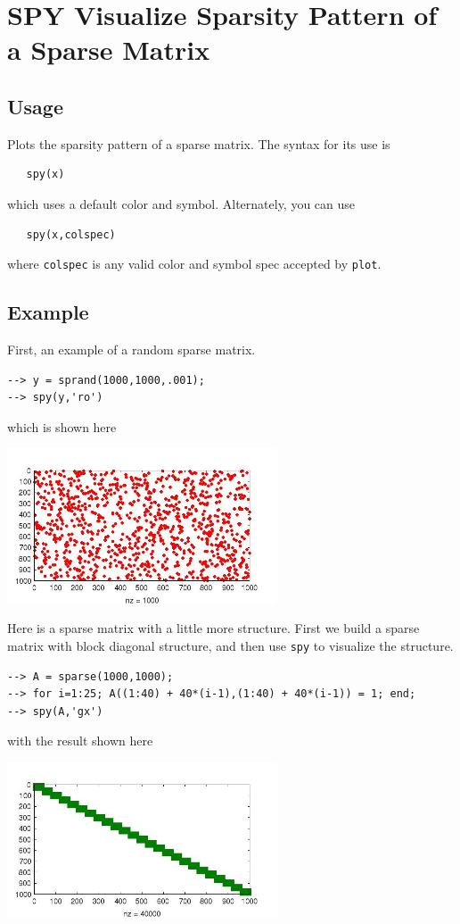 \section{SPY Visualize Sparsity Pattern of a Sparse Matrix}

\subsection{Usage}

Plots the sparsity pattern of a sparse matrix.  The syntax for its use is
\begin{verbatim}
   spy(x)
\end{verbatim}
which uses a default color and symbol.  Alternately, you can use
\begin{verbatim}
   spy(x,colspec)
\end{verbatim}
where \verb|colspec| is any valid color and symbol spec accepted by \verb|plot|.
\subsection{Example}

First, an example of a random sparse matrix.
\begin{verbatim}
--> y = sprand(1000,1000,.001);
--> spy(y,'ro')
\end{verbatim}
which is shown here


\centerline{\includegraphics[width=8cm]{spy1}}

Here is a sparse matrix with a little more structure.  First we build a 
sparse matrix with block diagonal structure, and then use \verb|spy| to 
visualize the structure.
\begin{verbatim}
--> A = sparse(1000,1000);
--> for i=1:25; A((1:40) + 40*(i-1),(1:40) + 40*(i-1)) = 1; end;
--> spy(A,'gx')
\end{verbatim}
with the result shown here


\centerline{\includegraphics[width=8cm]{spy2}}

